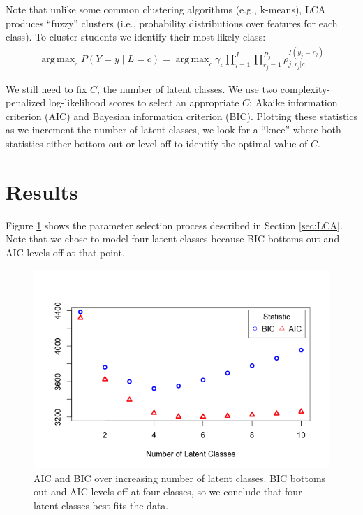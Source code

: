 \documentclass{edm_template}
\DeclareMathOperator*{\argmax}{arg\,max}
\begin{document}
Note that unlike some common clustering algorithms (e.g., k-means), LCA produces ``fuzzy'' clusters (i.e., probability distributions over features for each class). To cluster students we identify their most likely class:
\begin{align}
\argmax_{c} P(Y = y \;|\; L = c) = \argmax_{c} \gamma_{c} \prod_{j=1}^{J} \prod_{r_{j}=1}^{R_{j}} \rho_{j,r_{j}|c}^{I(y_{j} = r_{j})}
\label{eqn:LCA-argmax}
\end{align}

We still need to fix $C$, the number of latent classes. We use two complexity-penalized log-likelihood scores to select an appropriate $C$: Akaike information criterion (AIC) and Bayesian information criterion (BIC). Plotting these statistics as we increment the number of latent classes, we look for a ``knee'' where both statistics either bottom-out or level off to identify the optimal value of $C$.

\section{Results}
\label{sec:results}

Figure \ref{fig:lca-test-statistics} shows the parameter selection process described in Section \ref{sec:LCA}. Note that we chose to model four latent classes because BIC bottoms out and AIC levels off at that point.

\begin{figure}[htbp]
\includegraphics[scale=0.4]{lca-stats-plot.png}
\caption{AIC and BIC over increasing number of latent classes. BIC bottoms out and AIC levels off at four classes, so we conclude that four latent classes best fits the data.}
\label{fig:lca-test-statistics}
\end{figure}
\end{document}
